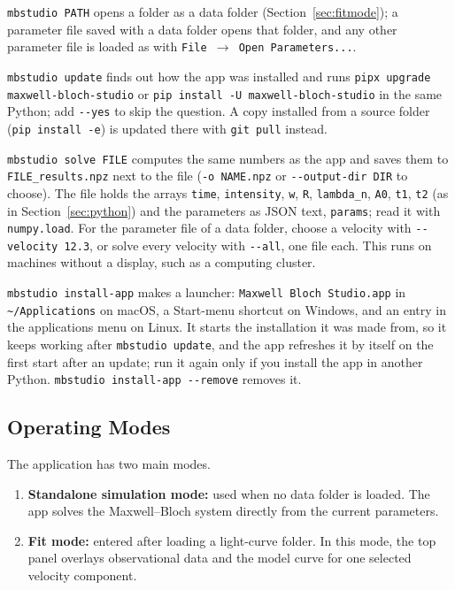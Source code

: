 \documentclass[12pt,a4paper]{article}
\newcommand{\menu}[1]{\texttt{#1}}
\begin{document}
\texttt{mbstudio PATH} opens a folder as a data folder (Section~\ref{sec:fitmode}); a
parameter file saved with a data folder opens that folder, and any other parameter file is
loaded as with \menu{File $\to$ Open Parameters...}.

\texttt{mbstudio update} finds out how the app was installed and runs
\texttt{pipx upgrade maxwell-bloch-studio} or \texttt{pip install -U maxwell-bloch-studio} in
the same Python; add \texttt{-{}-yes} to skip the question. A copy installed from a source folder
(\texttt{pip install -e}) is updated there with \texttt{git pull} instead.

\texttt{mbstudio solve FILE} computes the same numbers as the app and saves them to
\texttt{FILE\_results.npz} next to the file (\texttt{-o NAME.npz} or \texttt{-{}-output-dir DIR}
to choose). The file holds the arrays \texttt{time}, \texttt{intensity}, \texttt{w},
\texttt{R}, \texttt{lambda\_n}, \texttt{A0}, \texttt{t1}, \texttt{t2} (as in
Section~\ref{sec:python}) and the parameters as JSON text, \texttt{params}; read it with
\texttt{numpy.load}. For the parameter file of a data folder, choose a velocity with
\texttt{-{}-velocity 12.3}, or solve every velocity with \texttt{-{}-all}, one file each.
This runs on machines without a display, such as a computing cluster.

\texttt{mbstudio install-app} makes a launcher: \texttt{Maxwell Bloch Studio.app} in
\texttt{\textasciitilde/Applications} on macOS, a Start-menu shortcut on Windows, and an entry in the
applications menu on Linux. It starts the installation it was made from, so it keeps working
after \texttt{mbstudio update}, and the app refreshes it by itself on the first start after an
update; run it again only if you install the app in another Python.
\texttt{mbstudio install-app -{}-remove} removes it.

\subsection{Operating Modes}

The application has two main modes.

\begin{enumerate}[noitemsep]
  \item \textbf{Standalone simulation mode:} used when no data folder is loaded. The app solves the
  Maxwell--Bloch system directly from the current parameters.
  \item \textbf{Fit mode:} entered after loading a light-curve folder. In this mode, the top panel overlays
  observational data and the model curve for one selected velocity component.
\end{enumerate}
\end{document}
